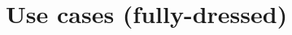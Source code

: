 \documentclass[fontsize=12pt,
               paper=a4,
               twoside=false,
               parskip=half,
               ]{scrartcl}
\begin{document}
\section{Use cases (fully-dressed)}









\end{document}
